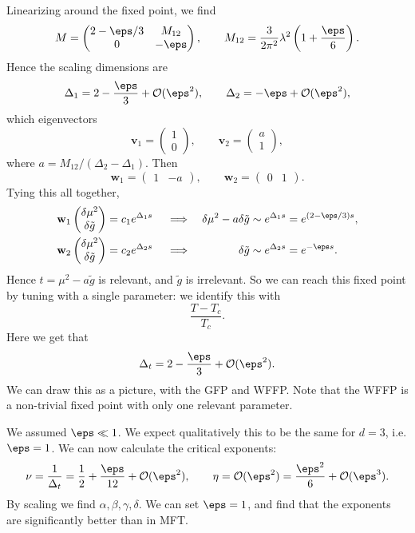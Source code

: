 \documentclass[12pt]{article}
\begin{document}
Linearizing around the fixed point, we find
\[
M =
\begin{pmatrix}
	2 - \eps/3 & M_{12} \\ 0 & -\eps
\end{pmatrix},
\qquad M_{12} = \frac{3}{2 \pi^2} \lambda^2 \left(1 + \frac{\eps}{6} \right).
\]
Hence the scaling dimensions are
\[
\Delta_1 = 2 - \frac{\eps}{3} + \mathcal{O}(\eps^2), \qquad \Delta_2 = - \eps + \mathcal{O}(\eps^2),
\]
which eigenvectors
\[
\mathbf{v}_1 =
\begin{pmatrix}
	1 \\ 0
\end{pmatrix}
, \qquad \mathbf{v}_2 =
\begin{pmatrix}
	a \\ 1
\end{pmatrix},
\]
where $a = M_{12}/(\Delta_2 - \Delta_1)$. Then
\[
\mathbf{w}_1 =
\begin{pmatrix}
	1  & -a
\end{pmatrix}
, \qquad \mathbf{w}_2 =
\begin{pmatrix}
	0 & 1
\end{pmatrix}.
\]
Tying this all together,
\begin{align*}
	\mathbf{w}_1
	\begin{pmatrix}
		\delta \mu^2 \\ \delta \tilde g
	\end{pmatrix}
	 &= c_1 e^{\Delta_1 s}  & &\implies  & \delta \mu^2 - a \delta \tilde g &\sim e^{\Delta_1 s} = e^{(2 - \eps/3)s}, \\
	 \mathbf{w}_2
	 \begin{pmatrix}
	 	\delta \mu^2 \\ \delta \tilde g
	 \end{pmatrix}
	 &= c_2 e^{\Delta_2 s} & &\implies & \delta\tilde g &\sim e^{\Delta_2 s} = e^{-\eps s}.
\end{align*}
Hence $t = \mu^2 - a \tilde g$ is relevant, and $\tilde g$ is irrelevant. So we can reach this fixed point by tuning with a single parameter: we identify this with
\[
\frac{T - T_c}{T_c}.
\]
Here we get that
\[
\Delta_t = 2 - \frac{\eps}{3} + \mathcal{O}(\eps^2).
\]
We can draw this as a picture, with the GFP and WFFP. Note that the WFFP is a non-trivial fixed point with only one relevant parameter.

We assumed $\eps \ll 1$. We expect qualitatively this to be the same for $d = 3$, i.e. $\eps = 1$. We can now calculate the critical exponents:
\[
\nu = \frac{1}{\Delta_t} = \frac{1}{2} + \frac{\eps}{12} + \mathcal{O}(\eps^2), \qquad \eta = \mathcal{O}(\eps^2) = \frac{\eps^2}{6} + \mathcal{O}(\eps^3).
\]
By scaling we find $\alpha, \beta, \gamma, \delta$. We can set $\eps = 1$, and find that the exponents are significantly better than in MFT.
\end{document}
